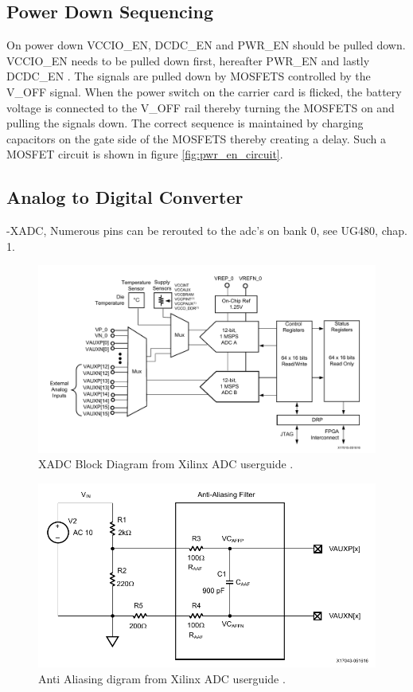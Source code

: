 \subsection{Power Down Sequencing}
On power down VCCIO\_EN, DCDC\_EN and PWR\_EN should be pulled down. 
VCCIO\_EN needs to be pulled down first, hereafter PWR\_EN and lastly DCDC\_EN .
The signals are pulled down by MOSFETS controlled by the V\_OFF signal.
When the power switch on the carrier card is flicked, the battery voltage is connected to the V\_OFF rail thereby turning the MOSFETS on and pulling the signals down. 
The correct sequence is maintained by charging capacitors on the gate side of the MOSFETS thereby creating a delay.
Such a MOSFET circuit is shown in figure \ref{fig:pwr_en_circuit}.

\subsection{Analog to Digital Converter}
-XADC, Numerous pins can be rerouted to the adc's on bank 0, see UG480, chap. 1.
\cite{adc}
\begin{figure}
	\centering
	\includegraphics[width=1\linewidth]{graphics/adc.pdf}
	\caption{XADC Block Diagram from Xilinx ADC userguide \cite{adc}.}
	\label{fig:adc}
\end{figure}

\begin{figure}
	\centering
	\includegraphics[width=0.6\linewidth]{graphics/anti_aliasing.pdf}
	\caption{Anti Aliasing digram from Xilinx ADC userguide \cite{adc}.}
	\label{fig:anti_a}
\end{figure}

